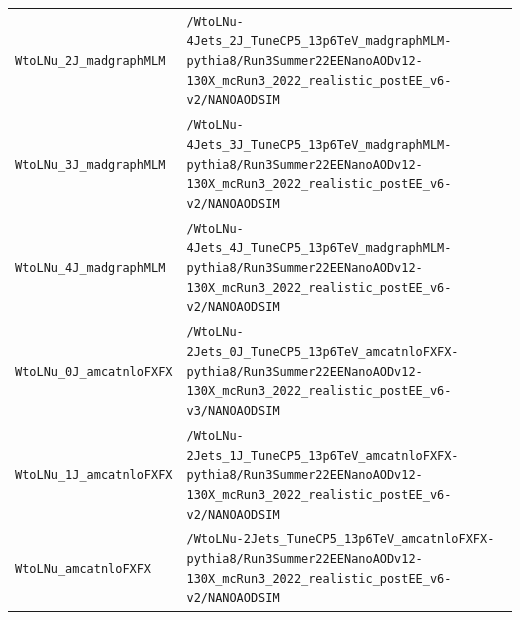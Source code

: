 \begin{longtable}{@{}>{\RaggedRight\arraybackslash}p{} >{\RaggedRight\arraybackslash}p{}@{}}
\addlinespace[2pt]
\texttt{WtoLNu\_\allowbreak{}2J\_\allowbreak{}madgraphMLM} & \texttt{/\allowbreak{}WtoLNu-\allowbreak{}4Jets\_\allowbreak{}2J\_\allowbreak{}TuneCP5\_\allowbreak{}13p6TeV\_\allowbreak{}madgraphMLM-\allowbreak{}pythia8/\allowbreak{}Run3Summer22EENanoAODv12-\allowbreak{}130X\_\allowbreak{}mcRun3\_\allowbreak{}2022\_\allowbreak{}realistic\_\allowbreak{}postEE\_\allowbreak{}v6-\allowbreak{}v2/\allowbreak{}NANOAODSIM} \\
\addlinespace[2pt]
\texttt{WtoLNu\_\allowbreak{}3J\_\allowbreak{}madgraphMLM} & \texttt{/\allowbreak{}WtoLNu-\allowbreak{}4Jets\_\allowbreak{}3J\_\allowbreak{}TuneCP5\_\allowbreak{}13p6TeV\_\allowbreak{}madgraphMLM-\allowbreak{}pythia8/\allowbreak{}Run3Summer22EENanoAODv12-\allowbreak{}130X\_\allowbreak{}mcRun3\_\allowbreak{}2022\_\allowbreak{}realistic\_\allowbreak{}postEE\_\allowbreak{}v6-\allowbreak{}v2/\allowbreak{}NANOAODSIM} \\
\addlinespace[2pt]
\texttt{WtoLNu\_\allowbreak{}4J\_\allowbreak{}madgraphMLM} & \texttt{/\allowbreak{}WtoLNu-\allowbreak{}4Jets\_\allowbreak{}4J\_\allowbreak{}TuneCP5\_\allowbreak{}13p6TeV\_\allowbreak{}madgraphMLM-\allowbreak{}pythia8/\allowbreak{}Run3Summer22EENanoAODv12-\allowbreak{}130X\_\allowbreak{}mcRun3\_\allowbreak{}2022\_\allowbreak{}realistic\_\allowbreak{}postEE\_\allowbreak{}v6-\allowbreak{}v2/\allowbreak{}NANOAODSIM} \\
\addlinespace[2pt]
\texttt{WtoLNu\_\allowbreak{}0J\_\allowbreak{}amcatnloFXFX} & \texttt{/\allowbreak{}WtoLNu-\allowbreak{}2Jets\_\allowbreak{}0J\_\allowbreak{}TuneCP5\_\allowbreak{}13p6TeV\_\allowbreak{}amcatnloFXFX-\allowbreak{}pythia8/\allowbreak{}Run3Summer22EENanoAODv12-\allowbreak{}130X\_\allowbreak{}mcRun3\_\allowbreak{}2022\_\allowbreak{}realistic\_\allowbreak{}postEE\_\allowbreak{}v6-\allowbreak{}v3/\allowbreak{}NANOAODSIM} \\
\addlinespace[2pt]
\texttt{WtoLNu\_\allowbreak{}1J\_\allowbreak{}amcatnloFXFX} & \texttt{/\allowbreak{}WtoLNu-\allowbreak{}2Jets\_\allowbreak{}1J\_\allowbreak{}TuneCP5\_\allowbreak{}13p6TeV\_\allowbreak{}amcatnloFXFX-\allowbreak{}pythia8/\allowbreak{}Run3Summer22EENanoAODv12-\allowbreak{}130X\_\allowbreak{}mcRun3\_\allowbreak{}2022\_\allowbreak{}realistic\_\allowbreak{}postEE\_\allowbreak{}v6-\allowbreak{}v2/\allowbreak{}NANOAODSIM} \\
\addlinespace[2pt]
\texttt{WtoLNu\_\allowbreak{}amcatnloFXFX} & \texttt{/\allowbreak{}WtoLNu-\allowbreak{}2Jets\_\allowbreak{}TuneCP5\_\allowbreak{}13p6TeV\_\allowbreak{}amcatnloFXFX-\allowbreak{}pythia8/\allowbreak{}Run3Summer22EENanoAODv12-\allowbreak{}130X\_\allowbreak{}mcRun3\_\allowbreak{}2022\_\allowbreak{}realistic\_\allowbreak{}postEE\_\allowbreak{}v6-\allowbreak{}v2/\allowbreak{}NANOAODSIM} \\

\end{longtable}
